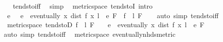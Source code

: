 \begin{isabellebody}
%
\isadelimproof
\ \ %
\endisadelimproof
%
\isatagproof
{}\isamarkupfalse%
\ tendsto{\isacharunderscore}{\kern0pt}iff\ \isamarkupfalse%
\ simp%
\endisatagproof
{\isafoldproof}%
%
\isadelimproof
\isanewline
%
\endisadelimproof
\isanewline
{}\isamarkupfalse%
\ {\isacharparenleft}{\kern0pt}\ metric{\isacharunderscore}{\kern0pt}space{\isacharparenright}{\kern0pt}\ tendstoI\ {\isacharbrackleft}{\kern0pt}intro{\isacharquery}{\kern0pt}{\isacharbrackright}{\kern0pt}{\isacharcolon}{\kern0pt}\isanewline
\ \ {\isachardoublequoteopen}{\isacharparenleft}{\kern0pt}{\isasymAnd}e{\isachardot}{\kern0pt}\ {}\ {\isacharless}{\kern0pt}\ e\ {\isasymLongrightarrow}\ eventually\ {\isacharparenleft}{\kern0pt}{\isasymlambda}x{\isachardot}{\kern0pt}\ dist\ {\isacharparenleft}{\kern0pt}f\ x{\isacharparenright}{\kern0pt}\ l\ {\isacharless}{\kern0pt}\ e{\isacharparenright}{\kern0pt}\ F{\isacharparenright}{\kern0pt}\ {\isasymLongrightarrow}\ {\isacharparenleft}{\kern0pt}f\ {\isasymlonglongrightarrow}\ l{\isacharparenright}{\kern0pt}\ F{\isachardoublequoteclose}\isanewline
%
\isadelimproof
\ \ %
\endisadelimproof
%
\isatagproof
{}\isamarkupfalse%
\ {\isacharparenleft}{\kern0pt}auto\ simp{\isacharcolon}{\kern0pt}\ tendsto{\isacharunderscore}{\kern0pt}iff{\isacharparenright}{\kern0pt}%
\endisatagproof
{\isafoldproof}%
%
\isadelimproof
\isanewline
%
\endisadelimproof
\isanewline
{}\isamarkupfalse%
\ {\isacharparenleft}{\kern0pt}\ metric{\isacharunderscore}{\kern0pt}space{\isacharparenright}{\kern0pt}\ tendstoD{\isacharcolon}{\kern0pt}\ {\isachardoublequoteopen}{\isacharparenleft}{\kern0pt}f\ {\isasymlonglongrightarrow}\ l{\isacharparenright}{\kern0pt}\ F\ {\isasymLongrightarrow}\ {}\ {\isacharless}{\kern0pt}\ e\ {\isasymLongrightarrow}\ eventually\ {\isacharparenleft}{\kern0pt}{\isasymlambda}x{\isachardot}{\kern0pt}\ dist\ {\isacharparenleft}{\kern0pt}f\ x{\isacharparenright}{\kern0pt}\ l\ {\isacharless}{\kern0pt}\ e{\isacharparenright}{\kern0pt}\ F{\isachardoublequoteclose}\isanewline
%
\isadelimproof
\ \ %
\endisadelimproof
%
\isatagproof
{}\isamarkupfalse%
\ {\isacharparenleft}{\kern0pt}auto\ simp{\isacharcolon}{\kern0pt}\ tendsto{\isacharunderscore}{\kern0pt}iff{\isacharparenright}{\kern0pt}%
\endisatagproof
{\isafoldproof}%
%
\isadelimproof
\isanewline
%
\endisadelimproof
\isanewline
{}\isamarkupfalse%
\ {\isacharparenleft}{\kern0pt}\ metric{\isacharunderscore}{\kern0pt}space{\isacharparenright}{\kern0pt}\ eventually{\isacharunderscore}{\kern0pt}nhds{\isacharunderscore}{\kern0pt}metric{\isacharcolon}{\kern0pt}\isanewline

\end{isabellebody}
